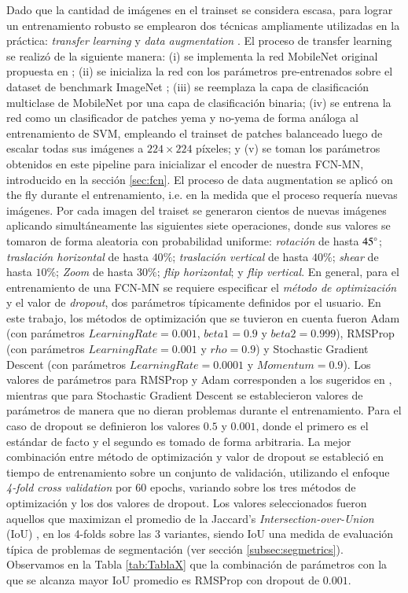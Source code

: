 \documentclass[a4paper,authoryear,review]{elsarticle}
\begin{document}
Dado que la cantidad de imágenes en el trainset se considera escasa, para lograr un entrenamiento robusto se emplearon dos técnicas ampliamente utilizadas en la práctica: \emph{transfer learning} \cite{pan2009survey} y \emph{data augmentation} \cite{shorten2019survey}. El proceso de transfer learning se realizó de la siguiente manera: (i) se implementa la red MobileNet original propuesta en \citet{howard2017mobilenets}; (ii) se inicializa la red con los parámetros pre-entrenados sobre el dataset de benchmark ImageNet \cite{kornblith2019better}; (iii) se reemplaza la capa de clasificación multiclase de MobileNet por una capa de clasificación binaria; (iv) se entrena la red como un clasificador de patches yema y no-yema de forma análoga al entrenamiento de SVM, empleando el trainset de patches balanceado luego de escalar todas sus imágenes a $224 \times 224$ píxeles; y (v) se toman los parámetros obtenidos en este pipeline para inicializar el encoder de nuestra FCN-MN, introducido en la sección \ref{sec:fcn}. El proceso de data augmentation se aplicó on the fly durante el entrenamiento, i.e. en la medida que el proceso requería nuevas imágenes. Por cada imagen del traiset se generaron cientos de nuevas imágenes aplicando simultáneamente las siguientes siete operaciones, donde sus valores se tomaron de forma aleatoria con probabilidad uniforme: \emph{rotación} de hasta $45\degree$; \emph{traslación horizontal} de hasta $40\%$; \emph{traslación vertical} de hasta $40\%$; \emph{shear} de hasta $10\%$; \emph{Zoom} de hasta $30\%$; \emph{flip horizontal}; y \emph{flip vertical}. 
En general, para el entrenamiento de una FCN-MN se requiere especificar el \emph{método de optimización} y el valor de \emph{dropout}, dos parámetros típicamente definidos por el usuario. En este trabajo, los  métodos de optimización que se tuvieron en cuenta fueron Adam (con parámetros $Learning Rate = 0.001$, $beta1= 0.9$ y $beta2 = 0.999$), RMSProp (con parámetros $Learning Rate = 0.001$ y $rho = 0.9$) y Stochastic Gradient Descent (con parámetros $Learning Rate = 0.0001$ y $Momentum = 0.9$). Los valores de parámetros para RMSProp y Adam corresponden a los sugeridos en \cite{ruder2018gradientdescent}, mientras que para Stochastic Gradient Descent se establecieron valores de parámetros de manera que no dieran problemas durante el entrenamiento. Para el caso de dropout se definieron los valores $0.5$ y $0.001$, donde el primero es el estándar de facto y el segundo es tomado de forma arbitraria. La mejor combinación entre método de optimización y valor de dropout se estableció en tiempo de entrenamiento sobre un conjunto de validación, utilizando el enfoque \emph{4-fold cross validation} por 60 epochs, variando sobre los tres métodos de optimización y los dos valores de dropout. Los valores seleccionados fueron aquellos que maximizan el promedio de la Jaccard’s \emph{Intersection-over-Union} (IoU) \citep{jaccard1912distribution},  en los 4-folds sobre las 3 variantes, siendo IoU una medida de evaluación típica de problemas de segmentación (ver sección \ref{subsec:segmetrics}). Observamos en la Tabla \ref{tab:TablaX} que la combinación de parámetros con la que se alcanza mayor IoU promedio es RMSProp con dropout de $0.001$. 
\end{document}
